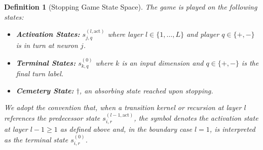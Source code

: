 \documentclass[twoside]{article}
\newcommand{\1}{\mathbf{1}}
\newtheorem{definition}{Definition}
\begin{document}
\begin{definition}[Stopping Game State Space]\label{def:adf-game-states} The game is played on the following states:
\begin{itemize}
    \item \textbf{Activation States:} $s_{j,q}^{(l, \mathrm{act})}$ where layer $l \in \{1, \dots, L\}$ and
        player $q \in \{+,-\}$ is in turn at neuron $j$.
    \item \textbf{Terminal States:} $s_{k,q}^{(0)}$ where $k$ is an input dimension and $q \in \{+,-\}$ is
        the final turn label.
    \item \textbf{Cemetery State:} $\dagger$, an absorbing state reached upon stopping.
\end{itemize}
We adopt the convention that, when a transition kernel or recursion at layer $l$ references the
predecessor state $s_{i,r}^{(l-1, \mathrm{act})}$, the symbol denotes the activation state at layer
$l-1 \ge 1$ as defined above and, in the boundary case $l = 1$, is interpreted as the terminal
state $s_{i,r}^{(0)}$.
\end{definition}
\end{document}
